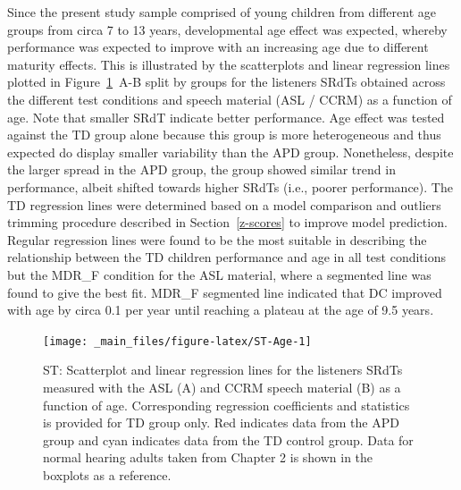 \documentclass[a4paper, twoside]{templates/ociamthesis}
\begin{document}
Since the present study sample comprised of young children from different age groups from circa 7 to 13 years, developmental age effect was expected, whereby performance was expected to improve with an increasing age due to different maturity effects. This is illustrated by the scatterplots and linear regression lines plotted in Figure~\ref{fig:ST-Age}~A-B split by groups for the listeners SRdTs obtained across the different test conditions and speech material (ASL / CCRM) as a function of age. Note that smaller SRdT indicate better performance. Age effect was tested against the TD group alone because this group is more heterogeneous and thus expected do display smaller variability than the APD group. Nonetheless, despite the larger spread in the APD group, the group showed similar trend in performance, albeit shifted towards higher SRdTs (i.e., poorer performance). The TD regression lines were determined based on a model comparison and outliers trimming procedure described in Section~\ref{z-scores} to improve model prediction. Regular regression lines were found to be the most suitable in describing the relationship between the TD children performance and age in all test conditions but the MDR\_F condition for the ASL material, where a segmented line was found to give the best fit. MDR\_F segmented line indicated that DC improved with age by circa 0.1 per year until reaching a plateau at the age of 9.5 years.\\

\begin{figure}[h]

{\centering \texttt{[image: \_main\_files/figure-latex/ST-Age-1]} 

}

\caption{ST: Scatterplot and linear regression lines for the listeners SRdTs measured with the ASL (A) and CCRM speech material (B) as a function of age. Corresponding regression coefficients and statistics is provided for TD group only. Red indicates data from the APD group and cyan indicates data from the TD control group. Data for normal hearing adults taken from Chapter 2 is shown in the boxplots as a reference.}\label{fig:ST-Age}
\end{figure}
\end{document}
